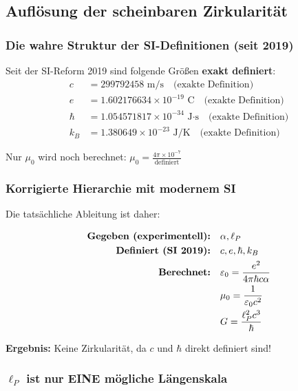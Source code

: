 	\subsection{Auflösung der scheinbaren Zirkularität}
	
	\subsubsection{Die wahre Struktur der SI-Definitionen (seit 2019)}
	
	\begin{tcolorbox}[colback=green!5!white,colframe=green!75!black,title=Moderne SI-Basis]
		Seit der SI-Reform 2019 sind folgende Größ{}en \textbf{exakt definiert}:
		\begin{align}
			c &= 299792458 \text{ m/s} \quad \text{(exakte Definition)}\\
			e &= 1.602176634 \times 10^{-19} \text{ C} \quad \text{(exakte Definition)}\\
			\hbar &= 1.054571817 \times 10^{-34} \text{ J·s} \quad \text{(exakte Definition)}\\
			k_B &= 1.380649 \times 10^{-23} \text{ J/K} \quad \text{(exakte Definition)}
		\end{align}
		
		Nur $\mu_0$ wird noch berechnet: $\mu_0 = \frac{4\pi \times 10^{-7}}{\text{definiert}}$
	\end{tcolorbox}
	
	\subsubsection{Korrigierte Hierarchie mit modernem SI}
	
	Die tatsächliche Ableitung ist daher:
	
	\begin{align}
		\text{\textbf{Gegeben (experimentell):}} &\quad \alpha, \ell_P\\
		\text{\textbf{Definiert (SI 2019):}} &\quad c, e, \hbar, k_B\\
		\text{\textbf{Berechnet:}} &\quad \varepsilon_0 = \frac{e^2}{4\pi\hbar c \alpha}\\
		&\quad \mu_0 = \frac{1}{\varepsilon_0 c^2}\\
		&\quad G = \frac{\ell_P^2 c^3}{\hbar}
	\end{align}
	
	\textbf{Ergebnis:} Keine Zirkularität, da $c$ und $\hbar$ direkt definiert sind!
	
	\subsubsection{$\ell_P$ ist nur EINE mögliche Längenskala}
	
